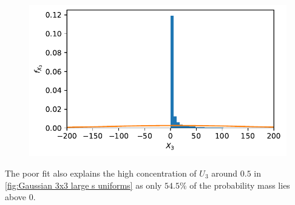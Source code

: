 \documentclass[../Thesis.tex]{subfiles}
\begin{document}
\begin{figure}[H]
    \centering
    \includegraphics[width=0.7\linewidth]{figures/ND examples/Gaussian 3x3 large s X3 KDE.pdf}
    \caption{}
    \label{fig:Gaussian 3x3 large s X3 KDE}
\end{figure}
The poor fit also explains the high concentration of $U_3$ around $0.5$ in \autoref{fig:Gaussian 3x3 large s uniforms} as only $54.5\%$ of the probability mass lies above $0$.
\end{document}

